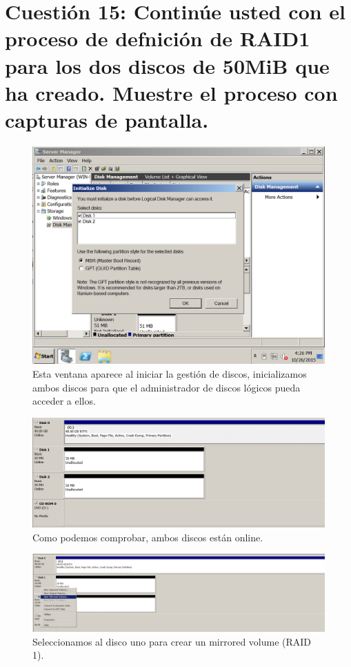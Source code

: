 \section{Cuestión 15: Continúe usted con el proceso de defnición de RAID1 para los dos discos de 50MiB que ha creado. Muestre el proceso con capturas de pantalla.}
\begin{figure}[H]
\centering
\includegraphics[scale=0.5]{raid1}
\caption{Esta ventana aparece al iniciar la gestión de discos, inicializamos ambos discos para que el administrador de discos lógicos pueda acceder a ellos.}
\end{figure}
\begin{figure}[H]
\centering
\includegraphics[scale=0.5]{raid2}
\caption{Como podemos comprobar, ambos discos están online.}
\end{figure}
\begin{figure}[H]
\centering
\includegraphics[scale=0.5]{raid3}
\caption{Seleccionamos al disco uno para crear un mirrored volume (RAID 1).}
\end{figure}
